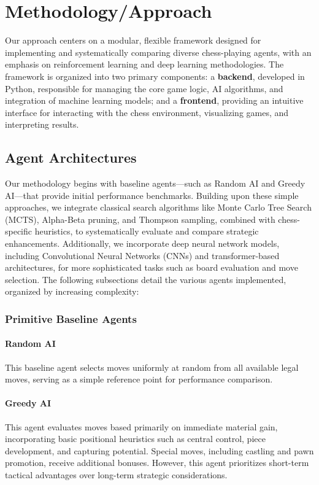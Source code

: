 \documentclass[journal, a4paper]{IEEEtran}
\begin{document}
\section{Methodology/Approach}
\label{sec:methodology}
Our approach centers on a modular, flexible framework designed for implementing and systematically comparing diverse chess-playing agents, with an emphasis on reinforcement learning and deep learning methodologies. The framework is organized into two primary components: a \textbf{backend}, developed in Python, responsible for managing the core game logic, AI algorithms, and integration of machine learning models; and a \textbf{frontend}, providing an intuitive interface for interacting with the chess environment, visualizing games, and interpreting results.

\subsection{Agent Architectures}
\noindent Our methodology begins with baseline agents—such as Random AI and Greedy AI—that provide initial performance benchmarks. Building upon these simple approaches, we integrate classical search algorithms like Monte Carlo Tree Search (MCTS), Alpha-Beta pruning, and Thompson sampling, combined with chess-specific heuristics, to systematically evaluate and compare strategic enhancements. Additionally, we incorporate deep neural network models, including Convolutional Neural Networks (CNNs) and transformer-based architectures, for more sophisticated tasks such as board evaluation and move selection.
The following subsections detail the various agents implemented, organized by increasing complexity:

\subsubsection{Primitive Baseline Agents} 
\paragraph{Random AI} This baseline agent selects moves uniformly at random from all available legal moves, serving as a simple reference point for performance comparison.
\paragraph{Greedy AI} This agent evaluates moves based primarily on immediate material gain, incorporating basic positional heuristics such as central control, piece development, and capturing potential. Special moves, including castling and pawn promotion, receive additional bonuses. However, this agent prioritizes short-term tactical advantages over long-term strategic considerations.
\end{document}
